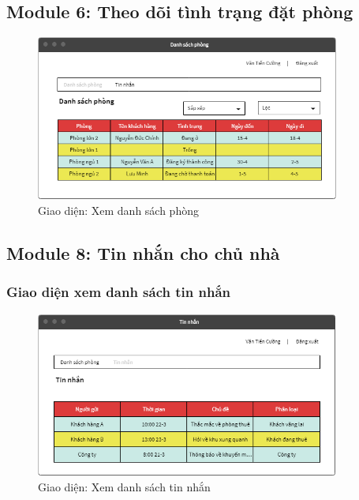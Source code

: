 \subsection{Module 6: Theo dõi tình trạng đặt phòng}
\begin{figure}[H]
	\centering
	\includegraphics[width=10cm]{parts/Cuong/images/danh-sach-phong.png}
	\vspace{0.5cm}
	\caption{Giao diện: Xem danh sách phòng}
\end{figure}

\subsection{Module 8: Tin nhắn cho chủ nhà}
\subsubsection{Giao diện xem danh sách tin nhắn}
\begin{figure}[H]
	\centering
	\includegraphics[width=10cm]{parts/Cuong/images/ds-tin-nhan.png}
	\vspace{0.5cm}
	\caption{Giao diện: Xem danh sách tin nhắn}
\end{figure}

\newpage 
